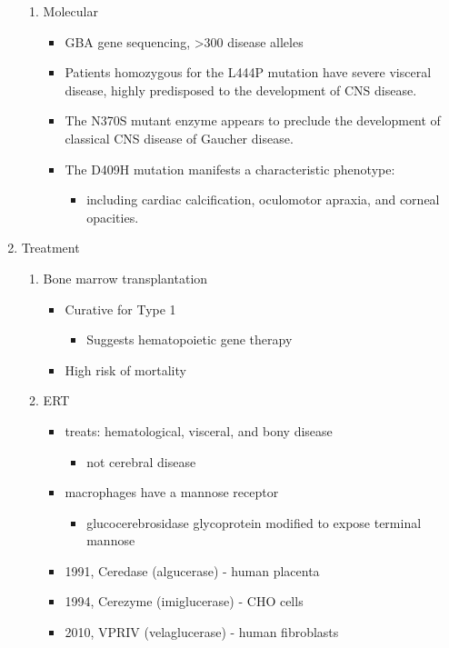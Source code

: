 \documentclass{scrartcl}
\begin{document}
\begin{enumerate}
\begin{enumerate}
\item Molecular
\label{sec:org0c41845}
\begin{itemize}
\item GBA gene sequencing, >300 disease alleles
\item Patients homozygous for the L444P mutation have severe visceral
disease, highly predisposed to the development of CNS disease.
\item The N370S mutant enzyme appears to preclude the development of classical CNS disease of Gaucher disease.
\item The D409H mutation manifests a characteristic phenotype:
\begin{itemize}
\item including cardiac calcification, oculomotor apraxia, and corneal opacities.
\end{itemize}
\end{itemize}
\end{enumerate}

\item Treatment
\label{sec:org16d7aad}
\begin{enumerate}
\item Bone marrow transplantation
\label{sec:org068aa94}
\begin{itemize}
\item Curative for Type 1
\begin{itemize}
\item Suggests hematopoietic gene therapy
\end{itemize}
\item High risk of mortality
\end{itemize}
\item ERT
\label{sec:org9b36f72}
\begin{itemize}
\item treats: hematological, visceral, and bony disease
\begin{itemize}
\item not cerebral disease
\end{itemize}
\item macrophages have a mannose receptor
\begin{itemize}
\item glucocerebrosidase glycoprotein modified to expose terminal mannose
\end{itemize}
\item 1991, Ceredase (algucerase) - human placenta
\item 1994, Cerezyme (imiglucerase) - CHO cells
\item 2010, VPRIV (velaglucerase) - human fibroblasts
\end{itemize}


\end{enumerate}
\end{enumerate}
\end{document}
